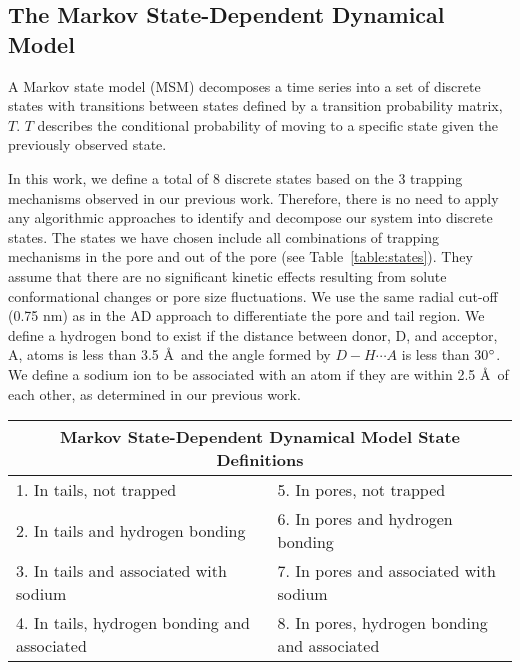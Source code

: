 \documentclass[journal=ancac3,manuscript=article,layout=twocolumn]{achemso}
\begin{document}
  \subsection{The Markov State-Dependent Dynamical Model}\label{method:MSMs}  

  A Markov state model (MSM) decomposes a time series into a set of discrete
  states with transitions between states defined by a transition probability
  matrix, $T$. $T$ describes the conditional probability of moving to a
  specific state given the previously observed
  state.~\cite{pande_everything_2010,wehmeyer_introduction_2018}

  In this work, we define a total of 8 discrete states based on the 3 trapping
  mechanisms observed in our previous work. Therefore, there is no need to
  apply any algorithmic approaches to identify and decompose our system into
  discrete states. The states we have chosen include all combinations of
  trapping mechanisms in the pore and out of the pore (see
  Table~\ref{table:states}). They assume that there are no significant kinetic
  effects resulting from solute conformational changes or pore size
  fluctuations. We use the same radial cut-off (0.75 nm) as in the AD approach to
  differentiate the pore and tail region. We define a hydrogen bond to exist
  if the distance between donor, D, and acceptor, A, atoms is less than 3.5
  \AA~and the angle formed by $D-H \cdots A$ is less than
  30$\degree$.~\cite{luzar_effect_1996} We define a sodium ion to be associated
  with an atom if they are within 2.5 \AA~of each other, as determined in our
  previous work.~\cite{coscia_chemically_2019}
  
  \begin{table*}[!htb]
	  \centering
	  \begin{tabular}{ll}
            \hline
            \hline
	  \multicolumn{2}{c}{Markov State-Dependent Dynamical Model State Definitions} \\
	  \hline
	  1. In tails, not trapped                      & 5. In pores, not trapped                     \\
	  2. In tails and hydrogen bonding              & 6. In pores and hydrogen bonding             \\
	  3. In tails and associated with sodium        & 7. In pores and associated with sodium       \\
	  4. In tails, hydrogen bonding and associated  ~~~~& 8. In pores, hydrogen bonding and associated \\
	  \hline
          \hline
	  \end{tabular}
	  \caption{We defined 8 discrete states based on all combinations of previously observed solute
	  trapping mechanisms.}\label{table:states}  
  \end{table*}
  
\end{document}
